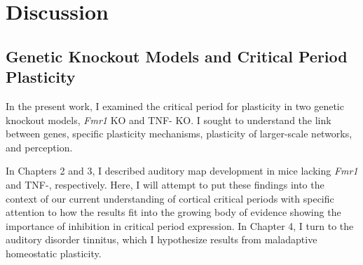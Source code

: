 \chapter{Discussion}

\section{Genetic Knockout Models and Critical Period Plasticity}

In the present work, I examined the critical period for plasticity in two genetic knockout models, \textit{Fmr1} KO and TNF-\textalpha{} KO. I sought to understand the link between genes, specific plasticity mechanisms, plasticity of larger-scale networks, and perception.

In Chapters 2 and 3, I described auditory map development in mice lacking \textit{Fmr1} and TNF-\textalpha{}, respectively. Here, I will attempt to put these findings into the context of our current understanding of cortical critical periods with specific attention to how the results fit into the growing body of evidence showing the importance of inhibition in critical period expression. In Chapter 4, I turn to the auditory disorder tinnitus, which I hypothesize results from maladaptive homeostatic plasticity.


